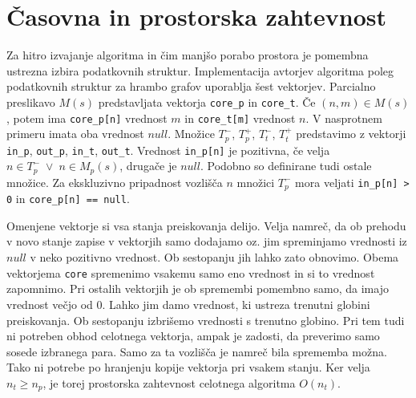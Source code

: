 \documentclass[a4paper, 12pt, ]{book}
\newcommand{\code}[1]{\mbox{\texttt{#1}}}
\begin{document}
	\section{Časovna in prostorska zahtevnost}
	\label{vf2:impl}
	Za hitro izvajanje algoritma in čim manjšo porabo prostora je pomembna ustrezna izbira podatkovnih struktur. Implementacija avtorjev algoritma	
	poleg podatkovnih struktur za hrambo grafov
	uporablja šest vektorjev. Parcialno preslikavo $M(s)$ predstavljata vektorja \code{core\_p} in \code{core\_t}. Če $(n,m) \in M(s)$, potem
	ima \code{core\_p[n]} vrednost $m$ in \code{core\_t[m]} vrednost $n$. V nasprotnem primeru imata oba vrednost $null$. Množice $T_p^-$, 
	$T_p^+$, $T_t^-$, $T_t^+$ predstavimo z vektorji \code{in\_p}, \code{out\_p}, \code{in\_t}, \code{out\_t}. Vrednost \code{in\_p[n]} je 
	pozitivna, če velja $n \in T_p^- \; \vee \; n \in M_p(s)$, drugače je $null$. Podobno so definirane tudi ostale množice. Za ekskluzivno pripadnost
	vozlišča $n$ množici $T_p^-$ mora veljati \code{in\_p[n] > 0} in \code{core\_p[n] == null}.
	
	Omenjene vektorje si vsa stanja preiskovanja delijo. Velja namreč, da ob prehodu v novo stanje zapise v vektorjih samo dodajamo oz. jim spreminjamo
	vrednosti iz $null$ v neko pozitivno vrednost. Ob sestopanju jih lahko zato obnovimo.  Obema vektorjema \code{core} spremenimo vsakemu samo eno
	vrednost in si to vrednost zapomnimo. Pri ostalih vektorjih je ob spremembi pomembno samo, da imajo vrednost večjo od 0. Lahko jim damo vrednost,
	ki ustreza trenutni globini preiskovanja. Ob sestopanju izbrišemo vrednosti s trenutno globino. Pri tem tudi ni potreben obhod celotnega vektorja,
	ampak je zadosti, da preverimo samo sosede izbranega para. Samo za ta vozlišča je namreč bila sprememba možna.
	Tako ni potrebe po hranjenju kopije vektorja pri vsakem stanju. Ker velja $n_t \geq n_p$, je torej prostorska zahtevnost celotnega algoritma $O(n_t)$.
	
\end{document}

